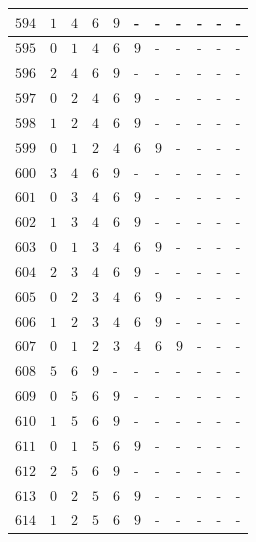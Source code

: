 \begin{appendices}
\begin{table}[H]
\begin{tabular} {|l|l|l|l|l|l|l|l|l|l|l|}
  		$ 594 $ & $ 1 $ &$ 4 $ &$ 6 $ &$ 9 $ & - &  - &  - &  - &  - &  -   \\ \hline
  		$ 595 $ & $ 0 $ &$ 1 $ &$ 4 $ &$ 6 $ &$ 9 $ & - &  - &  - &  - &  -   \\ \hline
  		$ 596 $ & $ 2 $ &$ 4 $ &$ 6 $ &$ 9 $ & - &  - &  - &  - &  - &  -   \\ \hline
  		$ 597 $ & $ 0 $ &$ 2 $ &$ 4 $ &$ 6 $ &$ 9 $ & - &  - &  - &  - &  -   \\ \hline
  		$ 598 $ & $ 1 $ &$ 2 $ &$ 4 $ &$ 6 $ &$ 9 $ & - &  - &  - &  - &  -   \\ \hline
  		$ 599 $ & $ 0 $ &$ 1 $ &$ 2 $ &$ 4 $ &$ 6 $ &$ 9 $ & - &  - &  - &  -   \\ \hline
  		$ 600 $ & $ 3 $ &$ 4 $ &$ 6 $ &$ 9 $ & - &  - &  - &  - &  - &  -   \\ \hline
  		$ 601 $ & $ 0 $ &$ 3 $ &$ 4 $ &$ 6 $ &$ 9 $ & - &  - &  - &  - &  -   \\ \hline
  		$ 602 $ & $ 1 $ &$ 3 $ &$ 4 $ &$ 6 $ &$ 9 $ & - &  - &  - &  - &  -   \\ \hline
  		$ 603 $ & $ 0 $ &$ 1 $ &$ 3 $ &$ 4 $ &$ 6 $ &$ 9 $ & - &  - &  - &  -   \\ \hline
  		$ 604 $ & $ 2 $ &$ 3 $ &$ 4 $ &$ 6 $ &$ 9 $ & - &  - &  - &  - &  -   \\ \hline
  		$ 605 $ & $ 0 $ &$ 2 $ &$ 3 $ &$ 4 $ &$ 6 $ &$ 9 $ & - &  - &  - &  -   \\ \hline
  		$ 606 $ & $ 1 $ &$ 2 $ &$ 3 $ &$ 4 $ &$ 6 $ &$ 9 $ & - &  - &  - &  -   \\ \hline
  		$ 607 $ & $ 0 $ &$ 1 $ &$ 2 $ &$ 3 $ &$ 4 $ &$ 6 $ &$ 9 $ & - &  - &  -   \\ \hline
  		$ 608 $ & $ 5 $ &$ 6 $ &$ 9 $ & - &  - &  - &  - &  - &  - &  -   \\ \hline
  		$ 609 $ & $ 0 $ &$ 5 $ &$ 6 $ &$ 9 $ & - &  - &  - &  - &  - &  -   \\ \hline
  		$ 610 $ & $ 1 $ &$ 5 $ &$ 6 $ &$ 9 $ & - &  - &  - &  - &  - &  -   \\ \hline
  		$ 611 $ & $ 0 $ &$ 1 $ &$ 5 $ &$ 6 $ &$ 9 $ & - &  - &  - &  - &  -   \\ \hline
  		$ 612 $ & $ 2 $ &$ 5 $ &$ 6 $ &$ 9 $ & - &  - &  - &  - &  - &  -   \\ \hline
  		$ 613 $ & $ 0 $ &$ 2 $ &$ 5 $ &$ 6 $ &$ 9 $ & - &  - &  - &  - &  -   \\ \hline
  		$ 614 $ & $ 1 $ &$ 2 $ &$ 5 $ &$ 6 $ &$ 9 $ & - &  - &  - &  - &  -   \\ \hline

\end{tabular}
\end{table}
\end{appendices}
